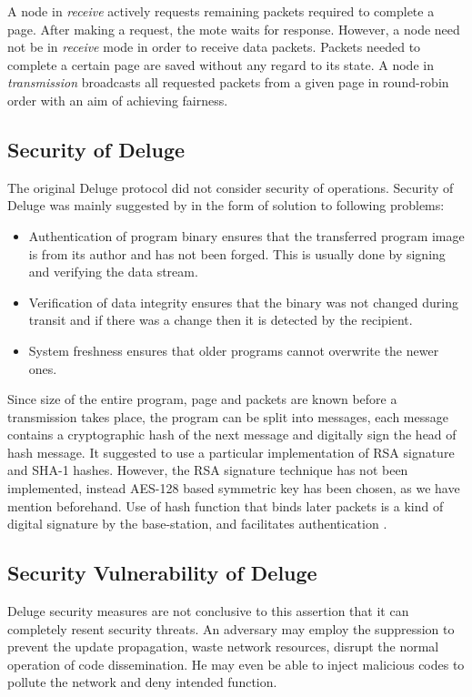 \documentclass[conference,man]{IEEEtran}
\begin{document}
A node in \textit{receive} actively requests remaining packets required to complete a page. After making a request, the mote waits for response. However, a node need not be in \textit{receive} mode in order to receive data packets.
Packets needed to complete a certain page are saved without any regard to its state.
A node in \textit{transmission} broadcasts all requested packets from a given page in round-robin order with an aim of achieving fairness.

\subsection{Security of Deluge}
The original Deluge protocol did not consider security of operations.
Security of Deluge was mainly suggested by \cite{1127826} in the form of solution to following problems:
\begin{itemize}
\item	Authentication of program binary ensures that the transferred program image is from its author and has not been forged. This is usually done by signing and verifying the data stream.
\item	Verification of data integrity ensures that the binary was not changed during transit and if there was a change then it is detected by the recipient. 
\item 	System freshness ensures that older programs cannot overwrite the newer ones.
\end{itemize}
Since size of the entire program, page and packets are known before a transmission takes place, the program can be split into messages, each message contains a cryptographic hash of the next message and digitally sign the head of hash message.
It suggested to use a particular implementation of RSA signature and SHA-1 hashes.
However, the RSA signature technique has not been implemented, instead AES-128 based symmetric key has been chosen, as we have mention beforehand. 
Use of hash function that binds later packets is a kind of digital signature by the base-station, and  facilitates authentication \cite{1127826}.




\subsection{Security Vulnerability of Deluge}
Deluge security measures are not conclusive to this assertion that it can completely resent security threats. 
An adversary may employ  the suppression to prevent the update propagation, waste network resources, disrupt the normal operation of code dissemination. 
He may even be able to inject malicious codes to pollute the network and deny intended function.
\end{document}
